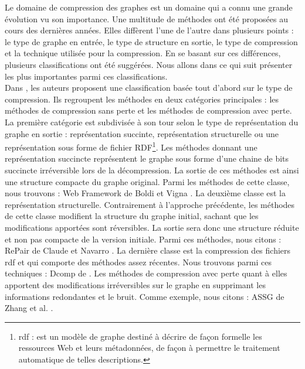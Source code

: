Le domaine de compression des graphes est un domaine qui a connu une grande évolution vu son importance. Une multitude de méthodes ont été proposées au cours des dernières années. Elles diffèrent l'une de l'autre dans plusieurs points : le type de graphe en entrée, le type de structure en sortie, le type de compression et la technique utilisée pour la compression. En se basant sur ces différences, plusieurs classifications ont été suggérées. Nous allons dans ce qui suit présenter les plus importantes parmi ces classifications.\\

Dans \citep{maneth2015survey}, les auteurs proposent une classification basée tout d'abord sur le type de compression. Ils regroupent les méthodes en deux catégories principales : les méthodes de compression sans perte et les méthodes de compression avec perte. La première catégorie est subdivisée à son tour selon le type de représentation du graphe en sortie : représentation succinte, représentation structurelle ou une représentation sous forme de fichier RDF\footnote{\gls{rdf} : est un modèle de graphe destiné à décrire de façon formelle les ressources Web et leurs métadonnées, de façon à permettre le traitement automatique de telles descriptions.}. 
Les méthodes donnant une représentation succincte représentent le graphe sous forme d'une chaine de bits succincte irréversible lors de la décompression. La sortie de ces méthodes est ainsi une structure compacte du graphe original. Parmi les méthodes de cette classe, nous trouvons : Web Framework de Boldi et Vigna \citep{boldi2004webgraph}. La deuxième classe est la représentation structurelle. Contrairement à l'approche précédente, les méthodes de cette classe modifient la structure du graphe initial, sachant que les modifications apportées sont réversibles. La sortie sera donc une structure réduite et non pas compacte de la version initiale. Parmi ces méthodes, nous citons : RePair de Claude et Navarro \citep{claude2010fast}. La dernière classe est la compression  des fichiers \gls{rdf} et qui comporte des méthodes assez récentes. Nous trouvons parmi ces techniques : Dcomp de \citep{martinez2012compression} . Les méthodes de compression avec perte quant à elles apportent des modifications irréversibles sur le graphe en supprimant les informations redondantes et le bruit. Comme exemple, nous citons : ASSG de Zhang et al. \citep{zhang2014assg}.\\

